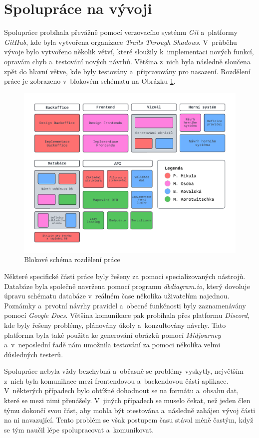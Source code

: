 \section{Spolupráce na vývoji}
Spolupráce probíhala převážně pomocí verzovacího systému \textit{Git} a~platformy \textit{GitHub}, kde byla vytvořena organizace \textit{Trails Through Shadows}. V~průběhu vývoje bylo vytvořeno několik větví, které sloužily k~implementaci nových funkcí, opravám chyb a~testování nových návrhů. Většina z~nich byla následně sloučena zpět do hlavní větve, kde byly testovány a~připravovány pro nasazení. Rozdělení práce je zobrazeno v~blokovém schématu na Obrázku \ref{fig:workflow}.

\begin{figure}[h]
  \centering
  \includegraphics[width=\textwidth]{../../shared/diagrams/blocks.pdf}
  \caption{Blokové schéma rozdělení práce}
  \label{fig:workflow}
\end{figure}

Některé specifické části práce byly řešeny za pomoci specializovaných nástrojů. Databáze byla společně navržena pomocí programu \textit{dbdiagram.io}, který dovoluje úpravu schématu databáze v~reálném čase několika uživatelům najednou. Poznámky a~prvotní návrhy pravidel a~obecné funkčnosti byly zaznamenávány pomocí \textit{Google Docs}. Většina komunikace pak probíhala přes platformu \textit{Discord}, kde byly řešeny problémy, plánovány úkoly a~konzultovány návrhy. Tato platforma byla také použita ke generování obrázků pomocí \textit{Midjourney} a~v~neposlední řadě nám umožnila testování za pomoci několika velmi důsledných testerů.

Spolupráce nebyla vždy bezchybná a~občasně se problémy vyskytly, největším z~nich byla komunikace mezi frontendovou a~backendovou částí aplikace. V~některých případech bylo obtížné dohodnout se na formátu a~obsahu dat, které se mezi nimi přenášely. V~jiných případech se muselo čekat, než jeden člen týmu dokončí svou část, aby mohla být otestována a~následně zahájen vývoj části na ni navazující. Tento problém se však postupem času stával méně častým, když se tým naučil lépe spolupracovat a~komunikovat.